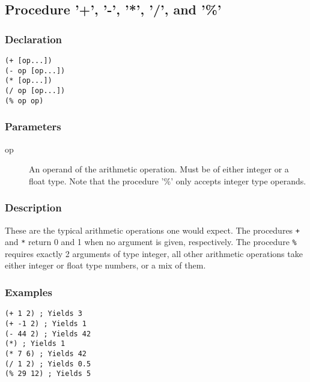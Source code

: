 \subsection{Procedure '+', '-', '*', '/', and '\%'}
\label{builtins/arithmetic-operations}

\subsubsection*{Declaration}
\begin{lstlisting}
(+ [op...])
(- op [op...])
(* [op...])
(/ op [op...])
(% op op)
\end{lstlisting}

\subsubsection*{Parameters}
\begin{description}
	\item[op] An operand of the arithmetic operation. Must be of either integer or a float type. Note that the procedure '\%' only accepts integer type operands.
\end{description}

\subsubsection*{Description}
These are the typical arithmetic operations one would expect. The procedures \lstinline|+| and \lstinline|*| return 0 and 1 when no argument is given, respectively. The procedure \lstinline|%| requires exactly 2 arguments of type integer, all other arithmetic operations take either integer or float type numbers, or a mix of them.

\subsubsection*{Examples}
\begin{lstlisting}
(+ 1 2) ; Yields 3
(+ -1 2) ; Yields 1
(- 44 2) ; Yields 42
(*) ; Yields 1
(* 7 6) ; Yields 42
(/ 1 2) ; Yields 0.5
(% 29 12) ; Yields 5
\end{lstlisting}

